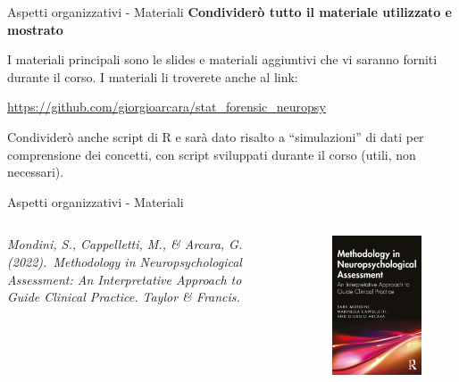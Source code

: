 \documentclass[
  ignorenonframetext,
]{beamer}
\begin{document}
\begin{frame}{Aspetti organizzativi - Materiali}
\label{aspetti-organizzativi---materiali}
\textbf{Condividerò tutto il materiale utilizzato e mostrato}

I materiali principali sono le slides e materiali aggiuntivi che vi
saranno forniti durante il corso. I materiali li troverete anche al
link:

\href{\%5Bhttps://github.com/giorgioarcara/stat_forensic_neuropsy}{\ul{https://github.com/giorgioarcara/stat\_forensic\_neuropsy}}

Condividerò anche script di R e sarà dato risalto a ``simulazioni'' di
dati per comprensione dei concetti, con script sviluppati durante il
corso (utili, non necessari).
\end{frame}

\begin{frame}{Aspetti organizzativi - Materiali}
\label{aspetti-organizzativi---materiali-1}
\begin{columns}

\emph{Mondini, S., Cappelletti, M., \& Arcara, G. (2022). Methodology in Neuropsychological Assessment: An Interpretative Approach to Guide Clinical Practice. Taylor \& Francis.}


\begin{figure}
\includegraphics[scale=0.5]{Figures/Methodology_book.png}
\end{figure}

\end{columns}
\end{frame}
\end{document}
